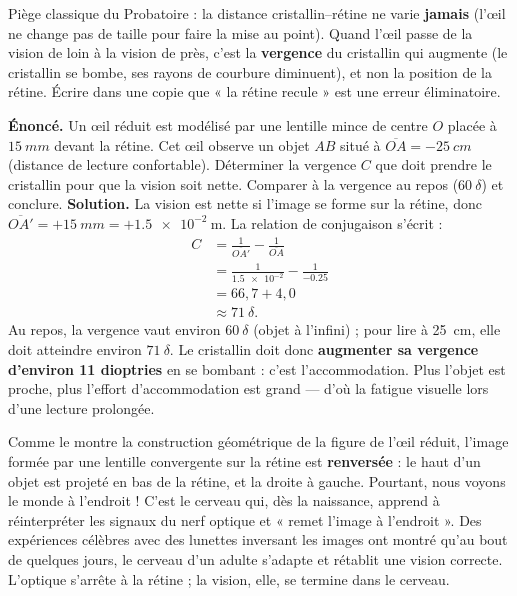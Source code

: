 \documentclass[11pt]{article}
\begin{document}
\begin{attention}
Piège classique du Probatoire : la distance cristallin--rétine ne varie \textbf{jamais} (l'œil ne change pas de taille pour faire la mise au point). Quand l'œil passe de la vision de loin à la vision de près, c'est la \textbf{vergence} du cristallin qui augmente (le cristallin se bombe, ses rayons de courbure diminuent), et non la position de la rétine. Écrire dans une copie que « la rétine recule » est une erreur éliminatoire.
\end{attention}

\begin{exoresolu}
\textbf{Énoncé.} Un œil réduit est modélisé par une lentille mince de centre $O$ placée à $\SI{15}{mm}$ devant la rétine. Cet œil observe un objet $AB$ situé à $\overline{OA} = -\SI{25}{cm}$ (distance de lecture confortable). Déterminer la vergence $C$ que doit prendre le cristallin pour que la vision soit nette. Comparer à la vergence au repos ($\SI{60}{\delta}$) et conclure.
\tcblower
\textbf{Solution.} La vision est nette si l'image se forme sur la rétine, donc $\overline{OA'} = +\SI{15}{mm} = +\num{1,5e-2}\ \mathrm{m}$. La relation de conjugaison s'écrit :
\begin{align*}
C &= \frac{1}{\overline{OA'}} - \frac{1}{\overline{OA}} \\
&= \frac{1}{\num{1,5e-2}} - \frac{1}{-\num{0,25}} \\
&= 66,7 + 4,0 \\
&\approx \SI{71}{\delta}.
\end{align*}
Au repos, la vergence vaut environ $\SI{60}{\delta}$ (objet à l'infini) ; pour lire à \SI{25}{cm}, elle doit atteindre environ $\SI{71}{\delta}$. Le cristallin doit donc \textbf{augmenter sa vergence d'environ 11 dioptries} en se bombant : c'est l'accommodation. Plus l'objet est proche, plus l'effort d'accommodation est grand — d'où la fatigue visuelle lors d'une lecture prolongée.
\end{exoresolu}

\begin{savaistu}
Comme le montre la construction géométrique de la figure de l'œil réduit, l'image formée par une lentille convergente sur la rétine est \textbf{renversée} : le haut d'un objet est projeté en bas de la rétine, et la droite à gauche. Pourtant, nous voyons le monde à l'endroit ! C'est le cerveau qui, dès la naissance, apprend à réinterpréter les signaux du nerf optique et « remet l'image à l'endroit ». Des expériences célèbres avec des lunettes inversant les images ont montré qu'au bout de quelques jours, le cerveau d'un adulte s'adapte et rétablit une vision correcte. L'optique s'arrête à la rétine ; la vision, elle, se termine dans le cerveau.
\end{savaistu}
\end{document}
